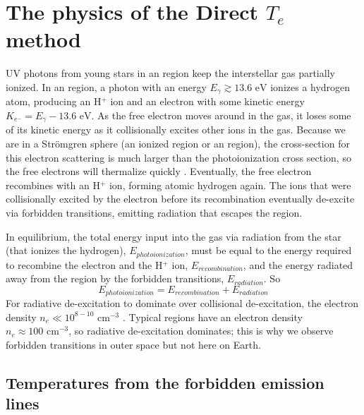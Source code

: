 \chapter[Direct method physics]{The physics of the Direct $T_e$ method}

UV photons from young stars in an  region keep the interstellar gas 
partially ionized.  In an  region, a photon with an energy 
$E_\gamma \gtrsim 13.6\text{ eV}$ ionizes a hydrogen atom, producing an H$^+$ 
ion and an electron with some kinetic energy 
$K_{e^-} = E_\gamma - 13.6\text{ eV}$.  As the free electron moves around in the 
gas, it loses some of its kinetic energy as it collisionally excites other ions 
in the gas.  Because we are in a Str\"{o}mgren sphere (an ionized region or an 
 region), the cross-section for this electron scattering is much 
larger than the photoionization cross section, so the free electrons will 
thermalize quickly \citep{DeRobertis87}.  Eventually, the free electron 
recombines with an H$^+$ ion, forming atomic hydrogen again.  The ions that were 
collisionally excited by the electron before its recombination eventually 
de-excite via forbidden transitions, emitting radiation that escapes the 
 region.

In equilibrium, the total energy input into the gas via radiation from the star 
(that ionizes the hydrogen), $E_{photoionization}$, must be equal to the energy 
required to recombine the electron and the H$^+$ ion, $E_{recombination}$, and 
the energy radiated away from the  region by the forbidden 
transitions, $E_{radiation}$.  So
\begin{equation}
    E_{photoionization} = E_{recombination} + E_{radiation}
\end{equation}
For radiative de-excitation to dominate over collisional de-excitation, the 
electron density $n_e \ll 10^{8-10}\text{ cm}^{-3}$ \citep{DeRobertis87}.  
Typical  regions have an electron density 
$n_e \approx 100\text{ cm}^{-3}$, so radiative de-excitation dominates; this is 
why we observe forbidden transitions in outer space but not here on Earth.


\section[Estimating the temperature]{Temperatures from the forbidden emission lines}

